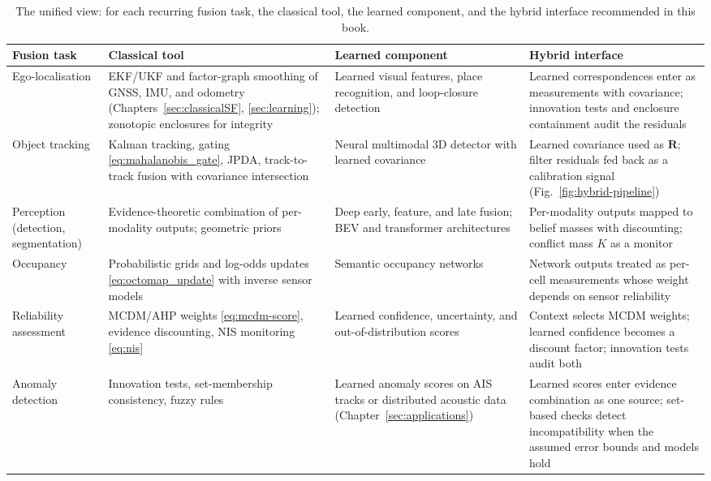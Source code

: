 \begin{table}[!t]
\caption{The unified view: for each recurring fusion task, the classical tool, the learned component, and the hybrid interface recommended in this book.}
\label{tab:unified-view}
\footnotesize
\renewcommand{\arraystretch}{1.25}%
\setlength{\tabcolsep}{3pt}
\begin{tabular}{>{\raggedright\arraybackslash}p{} >{\raggedright\arraybackslash}p{} >{\raggedright\arraybackslash}p{} >{\raggedright\arraybackslash}p{}}
\toprule
Fusion task & Classical tool & Learned component & Hybrid interface \\
\midrule
Ego-localisation & EKF/UKF and factor-graph smoothing of GNSS, IMU, and odometry (Chapters~\ref{sec:classicalSF}, \ref{sec:learning}); zonotopic enclosures for integrity & Learned visual features, place recognition, and loop-closure detection & Learned correspondences enter as measurements with covariance; innovation tests and enclosure containment audit the residuals \\[2pt]
Object tracking & Kalman tracking, gating \eqref{eq:mahalanobis_gate}, JPDA, track-to-track fusion with covariance intersection & Neural multimodal 3D detector with learned covariance & Learned covariance used as $\mathbf{R}$; filter residuals fed back as a calibration signal (Fig.~\ref{fig:hybrid-pipeline}) \\[2pt]
Perception (detection, segmentation) & Evidence-theoretic combination of per-modality outputs; geometric priors & Deep early, feature, and late fusion; BEV and transformer architectures & Per-modality outputs mapped to belief masses with discounting; conflict mass $K$ as a monitor \\[2pt]
Occupancy & Probabilistic grids and log-odds updates \eqref{eq:octomap_update} with inverse sensor models & Semantic occupancy networks & Network outputs treated as per-cell measurements whose weight depends on sensor reliability \\[2pt]
Reliability assessment & MCDM/AHP weights \eqref{eq:mcdm-score}, evidence discounting, NIS monitoring \eqref{eq:nis} & Learned confidence, uncertainty, and out-of-distribution scores & Context selects MCDM weights; learned confidence becomes a discount factor; innovation tests audit both \\[2pt]
Anomaly detection & Innovation tests, set-membership consistency, fuzzy rules & Learned anomaly scores on AIS tracks or distributed acoustic data (Chapter~\ref{sec:applications}) & Learned scores enter evidence combination as one source; set-based checks detect incompatibility when the assumed error bounds and models hold \\[2pt]

\end{tabular}
\end{table}
